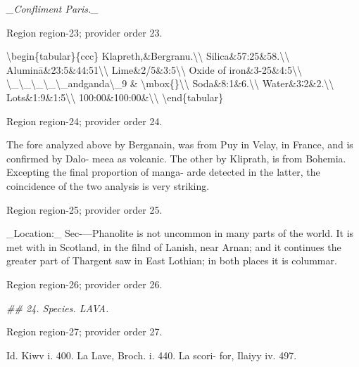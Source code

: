 \documentclass[11pt]{article}
\begin{document}
{\small\itshape \_Confliment Paris.\_\par}

{\scriptsize\color{gray} Region region-23; provider order 23.\par}
\medskip

\textbackslash{}begin\{tabular\}\{ccc\}
Klapreth,\&Bergranu.\textbackslash{}\textbackslash{}
Silica\&57:25\&58.\textbackslash{}\textbackslash{}
Aluminā\&23:5\&44:51\textbackslash{}\textbackslash{}
Lime\&2/5\&3:5\textbackslash{}\textbackslash{}
Oxide of iron\&3-25\&4:5\textbackslash{}\textbackslash{}
\textbackslash{}\_\textbackslash{}\_\textbackslash{}\_\textbackslash{}\_\textbackslash{}\_andganda\textbackslash{}\_9 \& \textbackslash{}mbox\{\}\textbackslash{}\textbackslash{}
Soda\&8:1\&6.\textbackslash{}\textbackslash{}
Water\&3∶2\&2.\textbackslash{}\textbackslash{}
Lots\&1:9\&1:5\textbackslash{}\textbackslash{}
100:00\&100:00\&\textbackslash{}\textbackslash{}
\textbackslash{}end\{tabular\}
\par

{\scriptsize\color{gray} Region region-24; provider order 24.\par}
\medskip

The fore analyzed above by Berganain, was from
Puy in Velay, in France, and is confirmed by Dalo-
meea as volcanic. The other by Kliprath, is from
Bohemia. Excepting the final proportion of manga-
arde detected in the latter, the coincidence of the two
analysis is very striking.
\par

{\scriptsize\color{gray} Region region-25; provider order 25.\par}
\medskip

\_Location:\_ Sec-—Phanolite is not uncommon in many
parts of the world. It is met with in Scotland, in the
filnd of Lanish, near Arnan; and it continues the
greater part of Thargent saw in East Lothian; in
both places it is colummar.
\par

{\scriptsize\color{gray} Region region-26; provider order 26.\par}
\medskip

{\small\itshape \#\# 24. Species. LAVA.\par}

{\scriptsize\color{gray} Region region-27; provider order 27.\par}
\medskip

Id. Kiwv i. 400. La Lave, Broch. i. 440. La scori-
for, Ilaiyy iv. 497.
\par
\end{document}
